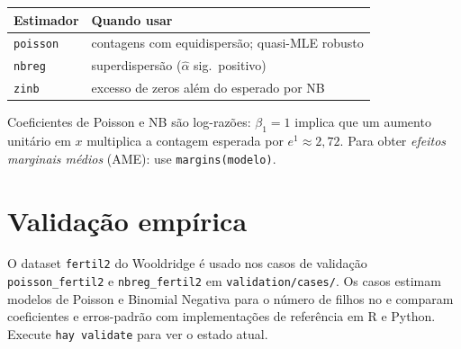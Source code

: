\begin{center}
\begin{tabular}{ll}
\toprule
\textbf{Estimador} & \textbf{Quando usar} \\
\midrule
\texttt{poisson}  & contagens com equidispersão; quasi-MLE robusto \\
\texttt{nbreg}    & superdispersão ($\hat\alpha$ sig.\ positivo) \\
\texttt{zinb}     & excesso de zeros além do esperado por NB \\
\bottomrule
\end{tabular}
\end{center}

\begin{nota}
  Coeficientes de Poisson e NB são log-razões: $\beta_1 = 1$ implica que um
  aumento unitário em $x$ multiplica a contagem esperada por $e^1 \approx 2{,}72$.
  Para obter \emph{efeitos marginais médios} (AME): use
  \lstinline{margins(modelo)}.
\end{nota}

\section{Validação empírica}

O dataset \texttt{fertil2} do Wooldridge é usado nos casos de validação
\texttt{poisson\_fertil2} e \texttt{nbreg\_fertil2} em \texttt{validation/cases/}.
Os casos estimam modelos de Poisson e Binomial Negativa para o número de filhos
no \hayashi{} e comparam coeficientes e erros-padrão com implementações de
referência em R e Python. Execute \lstinline{hay validate} para ver o estado atual.
